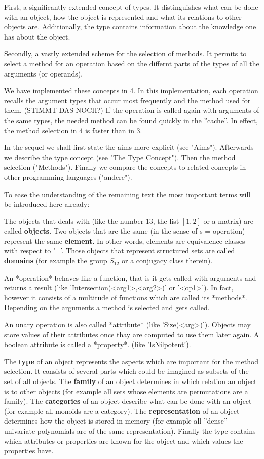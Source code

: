 First, a significantly extended concept of types. It distinguishes what can
be done with an object, how the object is represented and what its relations
to other objects are. Additionally, the type contains information about the
knowledge one has about the object.

Secondly, a vastly extended scheme for the selection of methods.
It permits to select a
method for an operation based on the differnt parts of the types of all the
arguments (or operands).

We have implemented these concepts in {\GAP} 4. In this implementation, each
operation recalls
the argument types that occur most frequently and the method used for
them. (STIMMT DAS NOCH?)  If the operation is called again with arguments of
the same types, the needed method can be found quickly in the ''cache''.
In effect, the method selection in {\GAP} 4 is faster than in {\GAP} 3.

In the sequel we shall first state the aims more explicit (see "Aims").
Afterwards we describe the type concept (see "The Type Concept"). Then
the method selection ("Methods"). Finally we compare the
concepts to related concepts in other programming languages ("andere").

To ease the understanding of the remaining text the most important terms
will be introduced here already:

The objects that {\GAP} deals with (like the number 13, the list $[1,2]$ or a
matrix) are called {\bf objects}. Two objects that are the same (in the
sense of {\GAP} s = operation) represent the same {\bf element}. In other
words, elements are equivalence classes with respect to '='. Those objects
that represent structured sets are called {\bf domains} (for example the
group $S_{12}$ or a conjugacy class therein).

An *operation* behaves like a function, that is it gets called with
arguments and returns a result (like 'Intersection(<arg1>,<arg2>)'
or '<op1>'). In
fact, however it consists of a multitude of functions which are called its
*methods*. Depending on the arguments a method is selected and gets
called.

An unary operation is also called *attribute* (like 'Size(<arg>)'). Objects
may store values of their attributes once thay are computed to use them
later again. A boolean attribute is called a *property*. (like
'IsNilpotent').

The {\bf type} of an object represents the aspects which are important for
the method selection. It consists of several parts which could be imagined
as subsets of the set of all objects. The {\bf family} of an object
determines in which relation an object is to other objects (for example all
sets whose elements are permutations are a family). The {\bf categories} of
an object describe what can be done with an object (for example all monoids
are a category). The {\bf representation} of an object determines how the
object is stored in memory (for example all ''dense'' univariate polynomials
are of the same representation). Finally the type contains which attributes
or properties are known for the object and which values the properties have.

